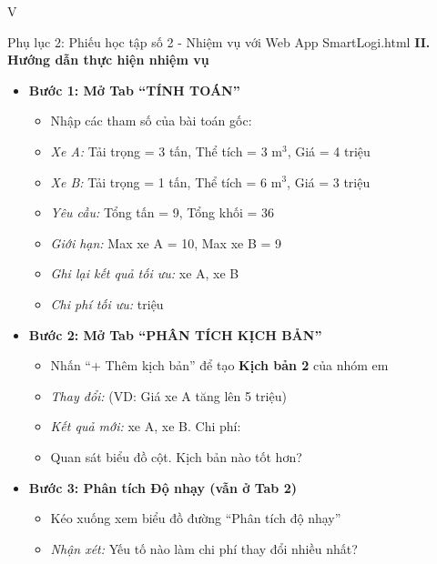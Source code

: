 \begin{competitionsection}{V}
\begin{phieuhoc_tap_box}{Phụ lục 2: Phiếu học tập số 2 - Nhiệm vụ với Web App SmartLogi.html}
\textbf{\color{accent}II. Hướng dẫn thực hiện nhiệm vụ}
\begin{itemize}[leftmargin=*,noitemsep]
\item \textbf{Bước 1: Mở Tab ``TÍNH TOÁN''}
    \begin{itemize}
    \item Nhập các tham số của bài toán gốc:
    \item \textit{Xe A:} Tải trọng = 3 tấn, Thể tích = 3 m$^3$, Giá = 4 triệu
    \item \textit{Xe B:} Tải trọng = 1 tấn, Thể tích = 6 m$^3$, Giá = 3 triệu
    \item \textit{Yêu cầu:} Tổng tấn = 9, Tổng khối = 36
    \item \textit{Giới hạn:} Max xe A = 10, Max xe B = 9
    \item \textit{Ghi lại kết quả tối ưu:} \underline{\hspace{2cm}} xe A, \underline{\hspace{2cm}} xe B
    \item \textit{Chi phí tối ưu:} \underline{\hspace{4cm}} triệu
    \end{itemize}
\item \textbf{Bước 2: Mở Tab ``PHÂN TÍCH KỊCH BẢN''}
    \begin{itemize}
    \item Nhấn ``+ Thêm kịch bản'' để tạo \textbf{Kịch bản 2} của nhóm em
    \item \textit{Thay đổi:} (VD: Giá xe A tăng lên 5 triệu) \underline{\hspace{6cm}}
    \item \textit{Kết quả mới:} \underline{\hspace{2cm}} xe A, \underline{\hspace{2cm}} xe B. Chi phí: \underline{\hspace{3cm}}
    \item Quan sát biểu đồ cột. Kịch bản nào tốt hơn? \underline{\hspace{4cm}}
    \end{itemize}
\item \textbf{Bước 3: Phân tích Độ nhạy (vẫn ở Tab 2)}
    \begin{itemize}
    \item Kéo xuống xem biểu đồ đường ``Phân tích độ nhạy''
    \item \textit{Nhận xét:} Yếu tố nào làm chi phí thay đổi nhiều nhất? \underline{\hspace{8cm}}
    \end{itemize}

\end{itemize}
\end{phieuhoc_tap_box}
\end{competitionsection}
